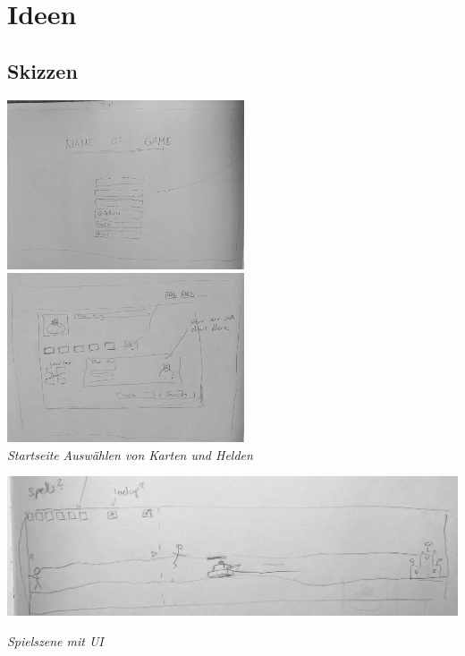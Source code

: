 \chapter{Ideen}

\section{Skizzen}

\includegraphics*[width=7cm]{resources/SK_startpage.jpeg} \quad \includegraphics*[width=7cm]{resources/SK_auswahl.jpeg}\\
\textit{Startseite} \qquad \qquad \qquad \qquad \qquad \qquad \qquad \quad \textit{Auswählen von Karten und Helden}
\\
\begin{center}
    \includegraphics*[width=14.5cm]{resources/sk_gamemain.jpeg}\\
\end{center}
\textit{Spielszene mit UI}

